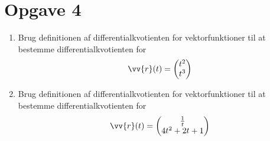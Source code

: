 \section*{Opgave 4}

\begin{enumerate}[label=\roman*)]
	\item Brug definitionen af differentialkvotienten for vektorfunktioner til at bestemme differentialkvotienten for 
	\begin{align*}
		\vv{r}(t) = 
		\begin{pmatrix}
			t^2 \\
			t^3
		\end{pmatrix}
	\end{align*}
	\item Brug definitionen af differentialkvotienten for vektorfunktioner til at bestemme differentialkvotienten for 
	\begin{align*}
		\vv{r}(t) = 
		\begin{pmatrix}
			\frac{1}{t} \\
			4t^2+2t+1
		\end{pmatrix}
	\end{align*}
\end{enumerate}